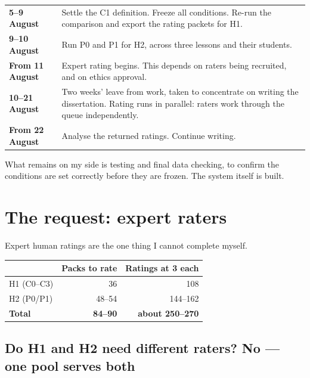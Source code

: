\documentclass[11pt,a4paper]{article}
\begin{document}
\begin{center}
\begin{tabular}{@{}p{32mm}p{100mm}@{}}
\toprule
\textbf{5--9 August} & Settle the C1 definition. Freeze all conditions. Re-run the
comparison and export the rating packets for H1.\\
\addlinespace
\textbf{9--10 August} & Run P0 and P1 for H2, across three lessons and their students.\\
\addlinespace
\textbf{From 11 August} & Expert rating begins. This depends on raters being recruited, and
on ethics approval.\\
\addlinespace
\textbf{10--21 August} & Two weeks' leave from work, taken to concentrate on writing the
dissertation. Rating runs in parallel: raters work through the queue independently.\\
\addlinespace
\textbf{From 22 August} & Analyse the returned ratings. Continue writing.\\
\bottomrule
\end{tabular}
\end{center}

\noindent What remains on my side is testing and final data checking, to confirm the
conditions are set correctly before they are frozen. The system itself is built.

\section{The request: expert raters}

Expert human ratings are the one thing I cannot complete myself.

\begin{center}
\begin{tabular}{@{}lrr@{}}
\toprule
& \textbf{Packs to rate} & \textbf{Ratings at 3 each}\\
\midrule
H1 (C0--C3) & 36 & 108\\
H2 (P0/P1) & 48--54 & 144--162\\
\midrule
\textbf{Total} & \textbf{84--90} & \textbf{about 250--270}\\
\bottomrule
\end{tabular}
\end{center}

\subsection{Do H1 and H2 need different raters? No — one pool serves both}
\end{document}

